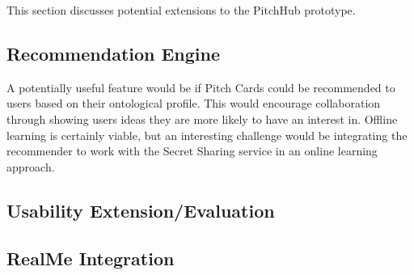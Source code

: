 This section discusses potential extensions to the PitchHub prototype.

\subsection{Recommendation Engine}

A potentially useful feature would be if Pitch Cards could be recommended to users based on their ontological profile. This would encourage collaboration through showing users ideas they are more likely to have an interest in. Offline learning is certainly viable, but an interesting challenge would be integrating the recommender to work with the Secret Sharing service in an online learning approach.

\subsection{Usability Extension/Evaluation}

\subsection{RealMe Integration}